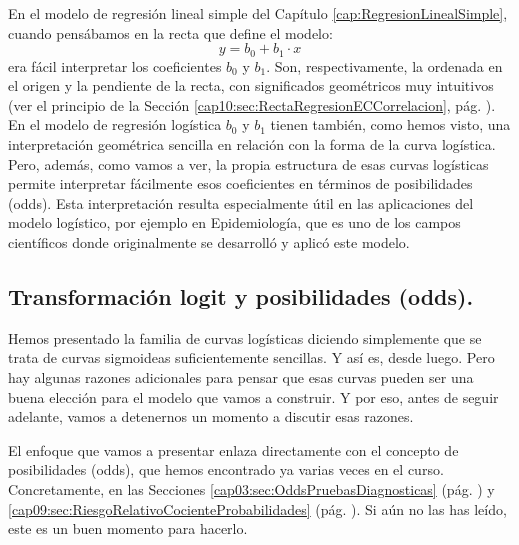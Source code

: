 En el modelo de regresión lineal simple del Capítulo \ref{cap:RegresionLinealSimple}, cuando pensábamos en la recta que define el modelo:
\[y = b_0 + b_1\cdot x\]
era fácil interpretar los coeficientes $b_0$ y $b_1$. Son, respectivamente, la ordenada en el origen y la pendiente de la recta, con significados geométricos muy intuitivos (ver el principio de la Sección \ref{cap10:sec:RectaRegresionECCorrelacion}, pág. \pageref{cap10:sec:RectaRegresionECCorrelacion}). En el modelo de regresión logística $b_0$ y $b_1$ tienen también, como hemos visto, una interpretación geométrica sencilla en relación con la forma de la curva logística. Pero, además, como vamos a ver, la propia estructura de esas curvas logísticas permite interpretar fácilmente esos coeficientes en términos de posibilidades (odds). Esta interpretación resulta especialmente útil en las aplicaciones del modelo logístico, por ejemplo en Epidemiología, que es uno de los campos científicos donde originalmente se desarrolló y aplicó este modelo.


\subsection{Transformación logit y posibilidades (odds).}

Hemos presentado la familia de curvas logísticas diciendo simplemente que se trata de curvas sigmoideas suficientemente sencillas. Y así es, desde luego. Pero hay algunas razones adicionales para pensar que esas curvas pueden ser una buena elección para el modelo que vamos a construir. Y por eso, antes de seguir adelante, vamos a detenernos un momento a discutir esas razones.

El enfoque que vamos a presentar enlaza directamente con el concepto de posibilidades (odds), que hemos encontrado ya varias veces en el curso. Concretamente, en las Secciones \ref{cap03:sec:OddsPruebasDiagnosticas} (pág.  \pageref{cap03:sec:OddsPruebasDiagnosticas})  y \ref{cap09:sec:RiesgoRelativoCocienteProbabilidades} (pág.  \pageref{cap09:sec:RiesgoRelativoCocienteProbabilidades}). Si aún no las has leído, este es un buen momento para hacerlo.

